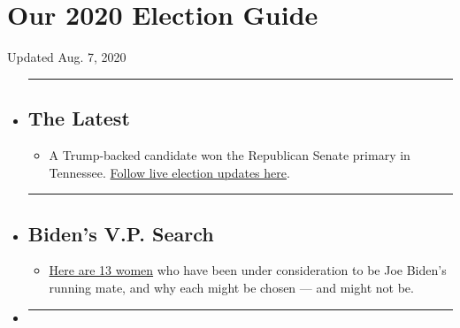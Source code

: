 \hypertarget{our-2020-election-guide}{%
\section{Our 2020 Election Guide}\label{our-2020-election-guide}}

Updated Aug. 7, 2020

\begin{itemize}
\item
  \begin{center}\rule{0.5\linewidth}{\linethickness}\end{center}

  \hypertarget{the-latest}{%
  \subsection{The Latest}\label{the-latest}}

  \begin{itemize}
  \tightlist
  \item
    A Trump-backed candidate won the Republican Senate primary in
    Tennessee.
    \href{https://www.nytimes3xbfgragh.onion/2020/08/07/us/elections/biden-vs-trump.html?action=click\&pgtype=Article\&state=default\&region=BELOW_MAIN_CONTENT\&context=storylines_guide}{Follow
    live election updates here}.
  \end{itemize}
\item
  \begin{center}\rule{0.5\linewidth}{\linethickness}\end{center}

  \hypertarget{bidens-vp-search}{%
  \subsection{Biden's V.P. Search}\label{bidens-vp-search}}

  \begin{itemize}
  \tightlist
  \item
    \href{https://www.nytimes3xbfgragh.onion/article/biden-vice-president-2020.html?action=click\&pgtype=Article\&state=default\&region=BELOW_MAIN_CONTENT\&context=storylines_guide}{Here
    are 13 women} who have been under consideration to be Joe Biden's
    running mate, and why each might be chosen --- and might not be.
  \end{itemize}
\item
  \begin{center}\rule{0.5\linewidth}{\linethickness}\end{center}


\end{itemize}
